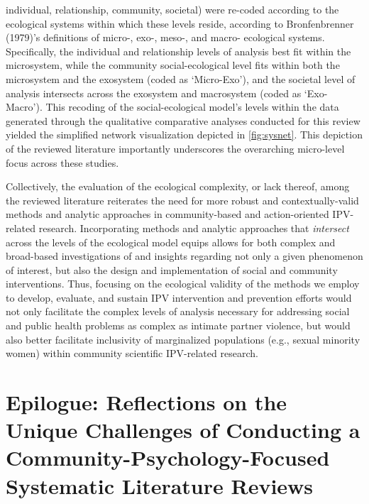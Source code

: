 \documentclass[11pt,]{tufte-book}
\begin{document}
individual, relationship, community, societal) were re-coded according
to the ecological systems within which these levels reside, according to
Bronfenbrenner (1979)'s definitions of micro-, exo-, meso-, and macro-
ecological systems. Specifically, the individual and relationship levels
of analysis best fit within the microsystem, while the community
social-ecological level fits within both the microsystem and the
exosystem (coded as `Micro-Exo'), and the societal level of analysis
intersects across the exosystem and macrosystem (coded as `Exo-Macro').
This recoding of the social-ecological model's levels within the data
generated through the qualitative comparative analyses conducted for
this review yielded the simplified network visualization depicted in
\cref{fig:sysnet}. This depiction of the reviewed
literature importantly underscores the overarching micro-level focus
across these studies.

Collectively, the evaluation of the ecological complexity, or lack
thereof, among the reviewed literature reiterates the need for more
robust and contextually-valid methods and analytic approaches in
community-based and action-oriented IPV-related research. Incorporating
methods and analytic approaches that \emph{intersect} across the levels
of the ecological model equips allows for both complex and broad-based
investigations of and insights regarding not only a given phenomenon of
interest, but also the design and implementation of social and community
interventions. Thus, focusing on the ecological validity of the methods
we employ to develop, evaluate, and sustain IPV intervention and
prevention efforts would not only facilitate the complex levels of
analysis necessary for addressing social and public health problems as
complex as intimate partner violence, but would also better facilitate
inclusivity of marginalized populations (e.g., sexual minority women)
within community scientific IPV-related research.

\chapter{\texorpdfstring{\textbf{Epilogue:} Reflections on the Unique
Challenges of Conducting a Community-Psychology-Focused Systematic
Literature
Reviews}{Epilogue: Reflections on the Unique Challenges of Conducting a Community-Psychology-Focused Systematic Literature Reviews}}\label{epilogue-reflections-on-the-unique-challenges-of-conducting-a-community-psychology-focused-systematic-literature-reviews}
\end{document}
